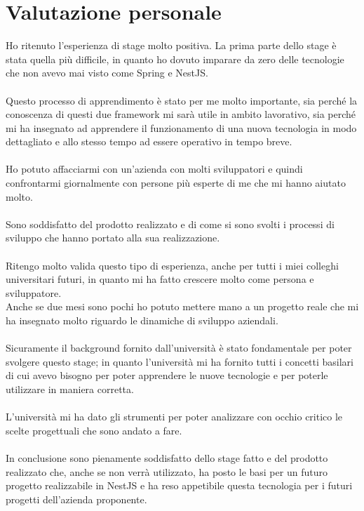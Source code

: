 \section{Valutazione personale}
Ho ritenuto l'esperienza di stage molto positiva. La prima parte dello stage è stata quella più difficile, 
in quanto ho dovuto imparare da zero delle tecnologie che non avevo mai visto come Spring e NestJS.
\\\\
Questo processo di apprendimento è stato per me molto importante, sia perché la conoscenza di questi due framework mi sarà
utile in ambito lavorativo, sia perché mi ha insegnato ad apprendere il funzionamento di una nuova tecnologia in modo
dettagliato e allo stesso tempo ad essere operativo in tempo breve.
\\\\
Ho potuto affacciarmi con un'azienda con molti sviluppatori e quindi confrontarmi giornalmente con persone più 
esperte di me che mi hanno aiutato molto.
\\\\
Sono soddisfatto del prodotto realizzato e di come si sono svolti i processi di sviluppo che hanno portato alla sua realizzazione. 
\\\\
Ritengo molto valida questo tipo di esperienza, anche per tutti i miei colleghi universitari futuri, in quanto mi ha 
fatto crescere molto come persona e sviluppatore. 
\\
Anche se due mesi sono pochi ho potuto mettere mano a un progetto reale che mi ha insegnato molto riguardo le dinamiche 
di sviluppo aziendali.
\\\\
Sicuramente il background fornito dall'università è stato fondamentale per poter svolgere questo stage; in quanto l'università mi ha 
fornito tutti i concetti basilari di cui avevo bisogno per poter apprendere le nuove tecnologie e per poterle utilizzare in maniera 
corretta.
\\\\
L'università mi ha dato gli strumenti per poter analizzare con occhio critico le scelte progettuali che sono andato a fare.
\\\\
In conclusione sono pienamente soddisfatto dello stage fatto e del prodotto realizzato che, anche se non verrà 
utilizzato, ha posto le basi per un futuro progetto realizzabile in NestJS e ha reso appetibile questa tecnologia
per i futuri progetti dell'azienda proponente.